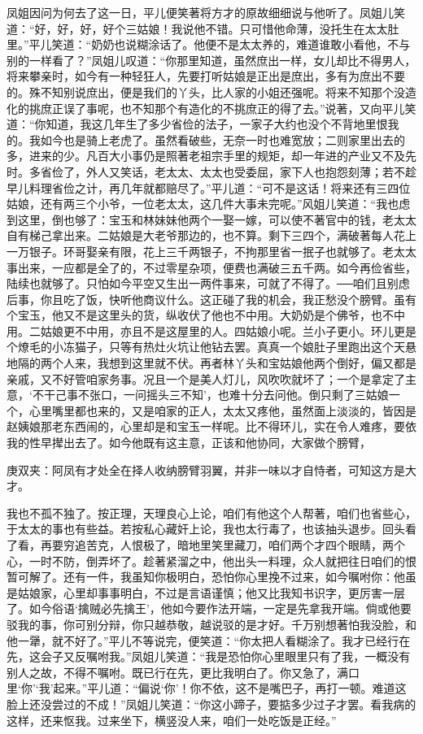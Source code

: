 \begin{parag}
    凤姐因问为何去了这一日，平儿便笑著将方才的原故细细说与他听了。凤姐儿笑道：“好，好，好，好个三姑娘！我说他不错。只可惜他命薄，没托生在太太肚里。”平儿笑道：“奶奶也说糊涂话了。他便不是太太养的，难道谁敢小看他，不与别的一样看了？”凤姐儿叹道：“你那里知道，虽然庶出一样，女儿却比不得男人，将来攀亲时，如今有一种轻狂人，先要打听姑娘是正出是庶出，多有为庶出不要的。殊不知别说庶出，便是我们的丫头，比人家的小姐还强呢。将来不知那个没造化的挑庶正误了事呢，也不知那个有造化的不挑庶正的得了去。”说著，又向平儿笑道：“你知道，我这几年生了多少省俭的法子，一家子大约也没个不背地里恨我的。我如今也是骑上老虎了。虽然看破些，无奈一时也难宽放；二则家里出去的多，进来的少。凡百大小事仍是照著老祖宗手里的规矩，却一年进的产业又不及先时。多省俭了，外人又笑话，老太太、太太也受委屈，家下人也抱怨刻薄；若不趁早儿料理省俭之计，再几年就都赔尽了。”平儿道：“可不是这话！将来还有三四位姑娘，还有两三个小爷，一位老太太，这几件大事未完呢。”风姐儿笑道：“我也虑到这里，倒也够了：宝玉和林妹妹他两个一娶一嫁，可以使不著官中的钱，老太太自有梯己拿出来。二姑娘是大老爷那边的，也不算。剩下三四个，满破著每人花上一万银子。环哥娶亲有限，花上三千两银子，不拘那里省一抿子也就够了。老太太事出来，一应都是全了的，不过零星杂项，便费也满破三五千两。如今再俭省些，陆续也就够了。只怕如今平空又生出一两件事来，可就了不得了。──咱们且别虑后事，你且吃了饭，快听他商议什么。这正碰了我的机会，我正愁没个膀臂。虽有个宝玉，他又不是这里头的货，纵收伏了他也不中用。大奶奶是个佛爷，也不中用。二姑娘更不中用，亦且不是这屋里的人。四姑娘小呢。兰小子更小。环儿更是个燎毛的小冻猫子，只等有热灶火坑让他钻去罢。真真一个娘肚子里跑出这个天悬地隔的两个人来，我想到这里就不伏。再者林丫头和宝姑娘他两个倒好，偏又都是亲戚，又不好管咱家务事。况且一个是美人灯儿，风吹吹就坏了；一个是拿定了主意，‘不干己事不张口，一问摇头三不知’，也难十分去问他。倒只剩了三姑娘一个，心里嘴里都也来的，又是咱家的正人，太太又疼他，虽然面上淡淡的，皆因是赵姨娘那老东西闹的，心里却是和宝玉一样呢。比不得环儿，实在令人难疼，要依我的性早撵出去了。如今他既有这主意，正该和他协同，大家做个膀臂，\begin{note}庚双夹：阿凤有才处全在择人收纳膀臂羽翼，并非一味以才自恃者，可知这方是大才。\end{note}我也不孤不独了。按正理，天理良心上论，咱们有他这个人帮著，咱们也省些心，于太太的事也有些益。若按私心藏奸上论，我也太行毒了，也该抽头退步。回头看了看，再要穷追苦克，人恨极了，暗地里笑里藏刀，咱们两个才四个眼睛，两个心，一时不防，倒弄坏了。趁著紧溜之中，他出头一料理，众人就把往日咱们的恨暂可解了。还有一件，我虽知你极明白，恐怕你心里挽不过来，如今嘱咐你：他虽是姑娘家，心里却事事明白，不过是言语谨慎；他又比我知书识字，更厉害一层了。如今俗语‘擒贼必先擒王’，他如今要作法开端，一定是先拿我开端。倘或他要驳我的事，你可别分辩，你只越恭敬，越说驳的是才好。千万别想著怕我没脸，和他一犟，就不好了。”平儿不等说完，便笑道：“你太把人看糊涂了。我才已经行在先，这会子又反嘱咐我。”凤姐儿笑道：“我是恐怕你心里眼里只有了我，一概没有别人之故，不得不嘱咐。既已行在先，更比我明白了。你又急了，满口里‘你’‘我’起来。”平儿道：“偏说‘你’！你不依，这不是嘴巴子，再打一顿。难道这脸上还没尝过的不成！”凤姐儿笑道：“你这小蹄子，要掂多少过子才罢。看我病的这样，还来怄我。过来坐下，横竖没人来，咱们一处吃饭是正经。”
\end{parag}


